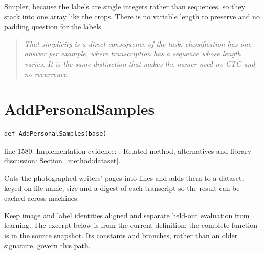 Simpler, because the labels are single integers rather than sequences, so they stack into one array like the crops. There is no variable length to preserve and no padding question for the labels.


\begin{quote}\small\itshape That simplicity is a direct consequence of the task: classification has one answer per example, where transcription has a sequence whose length varies. It is the same distinction that makes the namer need no CTC and no recurrence.\end{quote}


\section{AddPersonalSamples}\label{fn:train:AddPersonalSamples}
\begin{lstlisting}[style=sig]
def AddPersonalSamples(base)
\end{lstlisting}
 line 1580. Implementation evidence: \cite{code2026}. Related method, alternatives and library discussion: Section~\ref{method:dataset}.


Cuts the photographed writers' pages into lines and adds them to a dataset, keyed on file name, size and a digest of each transcript so the result can be cached across machines.


Keep image and label identities aligned and separate held-out evaluation from learning. The excerpt below is from the current definition; the complete function is in the source snapshot. Its constants and branches, rather than an older signature, govern this path.



